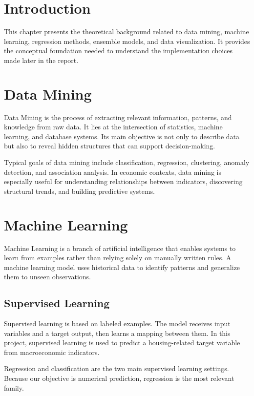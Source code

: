 
\section{Introduction}

This chapter presents the theoretical background related to data mining, machine learning, regression methods, ensemble models, and data visualization.
It provides the conceptual foundation needed to understand the implementation choices made later in the report.

\section{Data Mining}

Data Mining is the process of extracting relevant information, patterns, and knowledge from raw data.
It lies at the intersection of statistics, machine learning, and database systems.
Its main objective is not only to describe data but also to reveal hidden structures that can support decision-making.

Typical goals of data mining include classification, regression, clustering, anomaly detection, and association analysis.
In economic contexts, data mining is especially useful for understanding relationships between indicators, discovering structural trends, and building predictive systems.

\section{Machine Learning}

Machine Learning is a branch of artificial intelligence that enables systems to learn from examples rather than relying solely on manually written rules.
A machine learning model uses historical data to identify patterns and generalize them to unseen observations.

\subsection{Supervised Learning}

Supervised learning is based on labeled examples.
The model receives input variables and a target output, then learns a mapping between them.
In this project, supervised learning is used to predict a housing-related target variable from macroeconomic indicators.

Regression and classification are the two main supervised learning settings.
Because our objective is numerical prediction, regression is the most relevant family.

